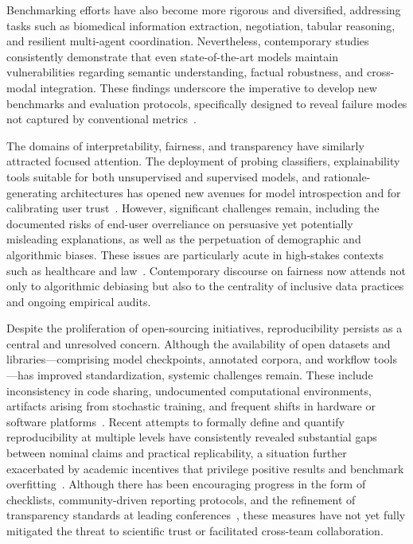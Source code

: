 \documentclass[sigconf]{acmart}
\begin{document}
Benchmarking efforts have also become more rigorous and diversified, addressing tasks such as biomedical information extraction, negotiation, tabular reasoning, and resilient multi-agent coordination. Nevertheless, contemporary studies consistently demonstrate that even state-of-the-art models maintain vulnerabilities regarding semantic understanding, factual robustness, and cross-modal integration. These findings underscore the imperative to develop new benchmarks and evaluation protocols, specifically designed to reveal failure modes not captured by conventional metrics~\cite{ref13,ref38,ref47,ref56,ref66,ref67,ref101}.

The domains of interpretability, fairness, and transparency have similarly attracted focused attention. The deployment of probing classifiers, explainability tools suitable for both unsupervised and supervised models, and rationale-generating architectures has opened new avenues for model introspection and for calibrating user trust~\cite{ref31,ref32,ref36,ref48,ref50,ref51,ref54,ref55}. However, significant challenges remain, including the documented risks of end-user overreliance on persuasive yet potentially misleading explanations, as well as the perpetuation of demographic and algorithmic biases. These issues are particularly acute in high-stakes contexts such as healthcare and law~\cite{ref31,ref33,ref36,ref39,ref45,ref53}. Contemporary discourse on fairness now attends not only to algorithmic debiasing but also to the centrality of inclusive data practices and ongoing empirical audits.

Despite the proliferation of open-sourcing initiatives, reproducibility persists as a central and unresolved concern. Although the availability of open datasets and libraries—comprising model checkpoints, annotated corpora, and workflow tools—has improved standardization, systemic challenges remain. These include inconsistency in code sharing, undocumented computational environments, artifacts arising from stochastic training, and frequent shifts in hardware or software platforms~\cite{ref74,ref75,ref80,ref81,ref83,ref85,ref86,ref87,ref91}. Recent attempts to formally define and quantify reproducibility at multiple levels have consistently revealed substantial gaps between nominal claims and practical replicability, a situation further exacerbated by academic incentives that privilege positive results and benchmark overfitting~\cite{ref79,ref82,ref85,ref87,ref91}. Although there has been encouraging progress in the form of checklists, community-driven reporting protocols, and the refinement of transparency standards at leading conferences~\cite{ref81,ref83,ref84}, these measures have not yet fully mitigated the threat to scientific trust or facilitated cross-team collaboration.
\end{document}
